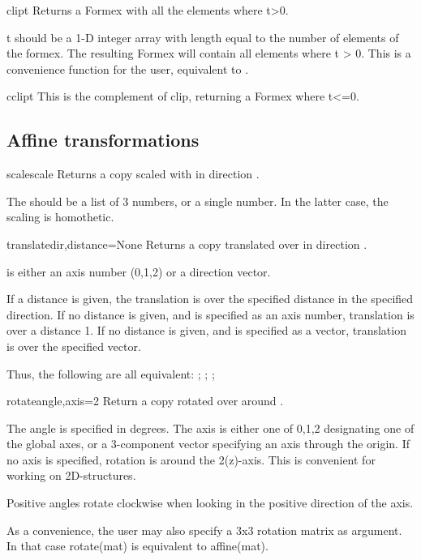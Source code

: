 \begin{methoddesc}{clip}{t}
Returns a Formex with all the elements where t>0.

t should be a 1-D integer array with length equal to the number
of elements of the formex.
The resulting Formex will contain all elements where t > 0.
This is a convenience function for the user, equivalent to
.
\end{methoddesc}

\begin{methoddesc}{cclip}{t}
This is the complement of clip, returning a Formex where t<=0.
\end{methoddesc}



\subsection{Affine transformations}

\begin{methoddesc}{scale}{scale}
Returns a copy scaled with  in direction .

The  should be a list of 3 numbers, or a single number. In the latter case, the scaling is homothetic.
\end{methoddesc}

\begin{methoddesc}{translate}{dir,distance=None}
Returns a copy translated over  in direction .

 is either an axis number (0,1,2) or a direction vector.

If a distance is given, the translation is over the specified
distance in the specified direction.
If no distance is given, and  is specified as an axis number,
translation is over a distance 1.
If no distance is given, and  is specified as a vector, translation
is over the specified vector.

Thus, the following are all equivalent:
;
;
;
\end{methoddesc}

\begin{methoddesc}{rotate}{angle,axis=2}
Return a copy rotated over  around .

The angle is specified in degrees.
The axis is either one of 0,1,2 designating one of the global axes,
or a 3-component vector specifying an axis through the origin.
If no axis is specified, rotation is around the 2(z)-axis. This is
convenient for working on 2D-structures.

Positive angles rotate clockwise when looking in the positive direction of the axis.

As a convenience, the user may also specify a 3x3 rotation matrix as argument.
In that case rotate(mat) is equivalent to affine(mat).
\end{methoddesc}



